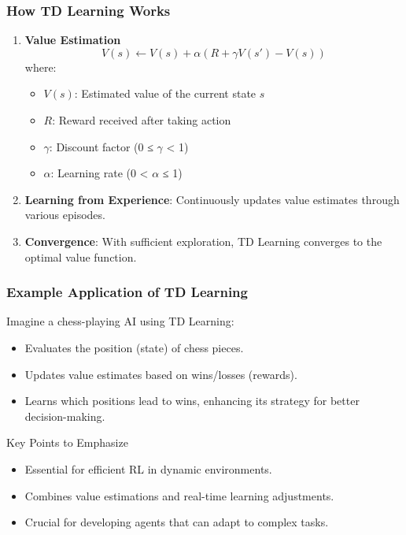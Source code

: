 \documentclass[aspectratio=169]{beamer}
\begin{document}
\begin{frame}[fragile]
    \frametitle{How TD Learning Works}
    \begin{enumerate}
        \item \textbf{Value Estimation}
        \begin{equation}
        V(s) \gets V(s) + \alpha \left( R + \gamma V(s') - V(s) \right)
        \end{equation}
        where:
        \begin{itemize}
            \item $V(s)$: Estimated value of the current state $s$
            \item $R$: Reward received after taking action
            \item $\gamma$: Discount factor (0 ≤ $\gamma$ < 1)
            \item $\alpha$: Learning rate (0 < $\alpha$ ≤ 1)
        \end{itemize}

        \item \textbf{Learning from Experience}: Continuously updates value estimates through various episodes.
        \item \textbf{Convergence}: With sufficient exploration, TD Learning converges to the optimal value function.
    \end{enumerate}
\end{frame}

\begin{frame}[fragile]
    \frametitle{Example Application of TD Learning}
    Imagine a chess-playing AI using TD Learning:
    \begin{itemize}
        \item Evaluates the position (state) of chess pieces.
        \item Updates value estimates based on wins/losses (rewards).
        \item Learns which positions lead to wins, enhancing its strategy for better decision-making.
    \end{itemize}
    
    \begin{block}{Key Points to Emphasize}
        \begin{itemize}
            \item Essential for efficient RL in dynamic environments.
            \item Combines value estimations and real-time learning adjustments.
            \item Crucial for developing agents that can adapt to complex tasks.
        \end{itemize}
    \end{block}
\end{frame}
\end{document}
